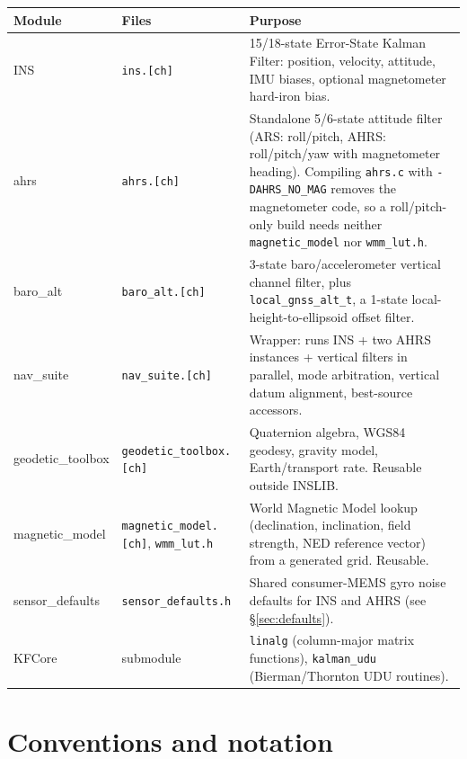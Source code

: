 \documentclass[11pt,a4paper]{article}
\newcommand{\code}[1]{\texttt{#1}}
\begin{document}
\begin{center}
\small
\begin{tabular}{@{}lp{4.1cm}p{6.9cm}@{}}
\toprule
\textbf{Module} & \textbf{Files} & \textbf{Purpose} \\
\midrule
INS      & \code{ins.[ch]}       & 15/18-state Error-State Kalman Filter: position, velocity, attitude, IMU biases, optional magnetometer hard-iron bias. \\
ahrs       & \code{ahrs.[ch]}        & Standalone 5/6-state attitude filter (ARS: roll/pitch, AHRS: roll/pitch/yaw with magnetometer heading). Compiling \code{ahrs.c} with \code{-DAHRS\_\allowbreak{}NO\_\allowbreak{}MAG} removes the magnetometer code, so a roll/pitch-only build needs neither \code{magnetic\_\allowbreak{}model} nor \code{wmm\_\allowbreak{}lut.h}. \\
baro\_alt  & \code{baro\_\allowbreak{}alt.[ch]}   & 3-state baro/accelerometer vertical channel filter, plus \code{local\_\allowbreak{}gnss\_\allowbreak{}alt\_\allowbreak{}t}, a 1-state local-height-to-ellipsoid offset filter. \\
nav\_suite & \code{nav\_\allowbreak{}suite.[ch]}  & Wrapper: runs INS + two AHRS instances + vertical filters in parallel, mode arbitration, vertical datum alignment, best-source accessors. \\
geodetic\_toolbox & \code{geodetic\_\allowbreak{}toolbox.[ch]} & Quaternion algebra, WGS84 geodesy, gravity model, Earth/transport rate. Reusable outside INSLIB. \\
magnetic\_model & \code{magnetic\_\allowbreak{}model.[ch]}, \code{wmm\_\allowbreak{}lut.h} & World Magnetic Model lookup (declination, inclination, field strength, NED reference vector) from a generated grid. Reusable. \\
sensor\_defaults & \code{sensor\_\allowbreak{}defaults.h} & Shared consumer-MEMS gyro noise defaults for INS and AHRS (see \S\ref{sec:defaults}). \\
KFCore     & submodule               & \code{linalg} (column-major matrix functions), \code{kalman\_\allowbreak{}udu} (Bierman/Thornton UDU routines). \\
\bottomrule
\end{tabular}
\end{center}

\section{Conventions and notation}
\label{sec:conventions}
\end{document}
